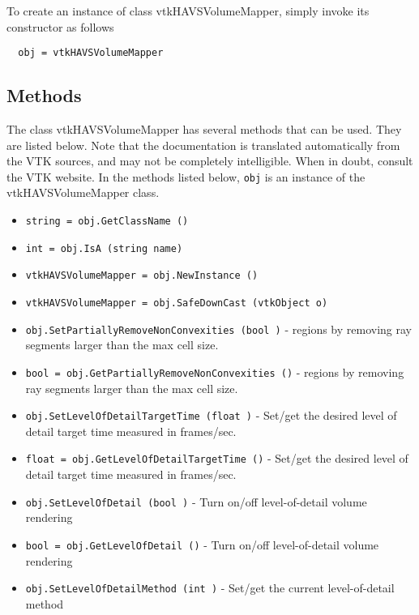 To create an instance of class vtkHAVSVolumeMapper, simply
invoke its constructor as follows
\begin{verbatim}
  obj = vtkHAVSVolumeMapper
\end{verbatim}
\subsection{Methods}

The class vtkHAVSVolumeMapper has several methods that can be used.
  They are listed below.
Note that the documentation is translated automatically from the VTK sources,
and may not be completely intelligible.  When in doubt, consult the VTK website.
In the methods listed below, \verb|obj| is an instance of the vtkHAVSVolumeMapper class.
\begin{itemize}
\item  \verb|string = obj.GetClassName ()|

\item  \verb|int = obj.IsA (string name)|

\item  \verb|vtkHAVSVolumeMapper = obj.NewInstance ()|

\item  \verb|vtkHAVSVolumeMapper = obj.SafeDownCast (vtkObject o)|

\item  \verb|obj.SetPartiallyRemoveNonConvexities (bool )| -  regions by removing ray segments larger than the max cell size.

\item  \verb|bool = obj.GetPartiallyRemoveNonConvexities ()| -  regions by removing ray segments larger than the max cell size.

\item  \verb|obj.SetLevelOfDetailTargetTime (float )| -  Set/get the desired level of detail target time measured in frames/sec.

\item  \verb|float = obj.GetLevelOfDetailTargetTime ()| -  Set/get the desired level of detail target time measured in frames/sec.

\item  \verb|obj.SetLevelOfDetail (bool )| -  Turn on/off level-of-detail volume rendering

\item  \verb|bool = obj.GetLevelOfDetail ()| -  Turn on/off level-of-detail volume rendering

\item  \verb|obj.SetLevelOfDetailMethod (int )| -  Set/get the current level-of-detail method


\end{itemize}
